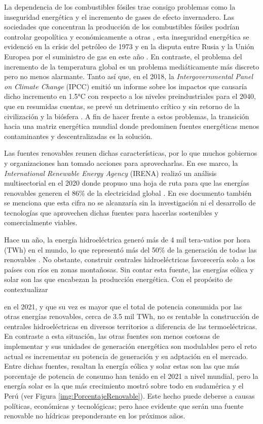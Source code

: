 
La dependencia de los combustibles fósiles trae consigo problemas como la inseguridad energética y el incremento de gases de efecto invernadero. Las sociedades que concentran la producción de los combustibles fósiles podrían controlar geopolítica y económicamente a otras \cite{mayer2022fossil}, esta inseguridad energética se evidenció en la crísis del petróleo de 1973 \cite{vernon1976oil} y en la disputa entre Rusia y la Unión Europea por el suministro de gas en este año \cite{rodriguez2022improving}. En contraste, el problema del incremento de la temperatura global es un problema mediáticamente más discreto pero no menos alarmante. Tanto así que, en el 2018, la \textit{Intergovernmental Panel on Climate Change} (IPCC) emitió un informe sobre los impactos que causaría dicho incremento en 1.5°C con respecto a los niveles preindustriales para el 2040, que en resumidas cuentas, se prevé un detrimento crítico y sin retorno de la civilización y la biósfera \cite{guilyardi2018ipcc}. A fin de hacer frente a estos problemas, la transición hacia una matriz energética mundial donde predominen fuentes energéticas menos contaminantes y descentralizadas es la solución. 

Las fuentes renovables reunen dichas características, por lo que muchos gobiernos y organizaciones han tomado acciones para aprovecharlas. En ese marco, la \textit{International Renewable Energy Agency} (IRENA) realizó un análisis multisectorial en el 2020 donde propuso una hoja de ruta para que las energías renovables generen el 86\% de la electricidad global \cite{asmelash2020role}. En ese documento también se menciona que esta cifra no se alcanzaría sin la investigación ni el desarrollo de tecnologías que aprovechen dichas fuentes para hacerlas sostenibles y comercialmente viables.


Hace un año, la energía hidroeléctrica generó más de 4 mil tera-vatios por hora (TWh) en el mundo, lo que representó más del 50\% de la generación de todas las renovables \cite{irena2022international}. No obstante, construir centrales hidroeléctricas favorecería solo a los países con ríos en zonas montañosas. Sin contar esta fuente, las energías eólica y solar son las que encabezan la producción energética. Con el propósito de contextualizar 

en el 2021, y que su vez
es mayor que el total de potencia consumida por las otras energías renovables, cerca de 3.5 mil TWh, no es rentable la construcción de centrales 
hidroeléctricas en diversos territorios a diferencia de las termoeléctricas. En contraste a esta situación, las otras fuentes son menos costosas de implementar y sus unidades
de generación energética son modulables pero el reto actual es incrementar su potencia de generación y su adptación en el mercado. Entre dichas fuentes, resaltan la energía eólica y solar 
estas son las que más porcentaje de potencia de consumo han tenido  en el 2021 a nivel mundial, pero la energía solar es la que más crecimiento mostró sobre todo en sudamérica y el Perú
 (ver Figura \ref{img:PorcentajeRenovable}). Este hecho puede deberse a causas políticas, económicas y tecnológicas; pero hace evidente que serán una fuente renovable no hídricas preponderante en los próximos años. 

